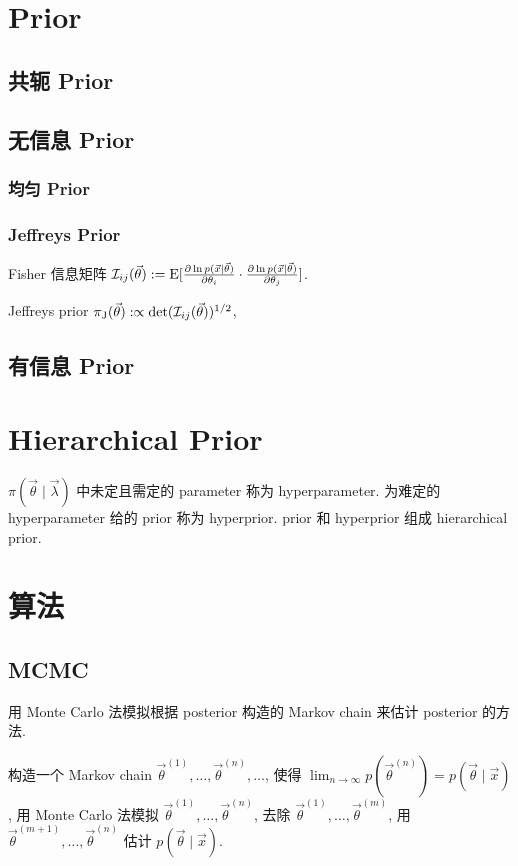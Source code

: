 \section{Prior}

\subsection{共轭 Prior}

\subsection{无信息 Prior}

\subsubsection{均匀 Prior}

\subsubsection{Jeffreys Prior}

Fisher 信息矩阵 $\mathcal{I}_{ij}(\vec{\theta}):=\text{E}[\frac{\partial\ln p(\vec{x}\mid \vec{\theta})}{\partial \theta_i}\cdot\frac{\partial\ln p(\vec{x}\mid \vec{\theta})}{\partial \theta_j}]$.

Jeffreys prior $\pi_\text{J}(\vec{\theta}):\propto\det(\mathcal{I}_{ij}(\vec{\theta}))^{1/2}$, 

\subsection{有信息 Prior}

\section{Hierarchical Prior}

$\pi(\vec{\theta}\mid \vec{\lambda})$ 中未定且需定的 parameter 称为 hyperparameter. 为难定的 hyperparameter 给的 prior 称为 hyperprior. prior 和 hyperprior 组成 hierarchical prior.

\section{算法}

\subsection{MCMC}

用 Monte Carlo 法模拟根据 posterior 构造的 Markov chain 来估计 posterior 的方法.

构造一个 Markov chain $\vec{\theta}^{(1)},\dots,\vec{\theta}^{(n)},\dots$, 使得 $\lim_{n\to\infty}p(\vec{\theta}^{(n)})=p(\vec{\theta}\mid \vec{x})$, 用 Monte Carlo 法模拟 $\vec{\theta}^{(1)},\dots,\vec{\theta}^{(n)}$, 去除 $\vec{\theta}^{(1)},\dots,\vec{\theta}^{(m)}$, 用 $\vec{\theta}^{(m+1)},\dots,\vec{\theta}^{(n)}$ 估计 $p(\vec{\theta}\mid \vec{x})$.
